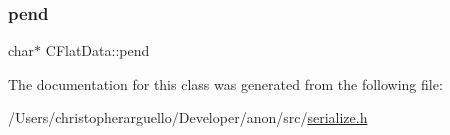 \mbox{\label{class_c_flat_data_add53aa6440254a30392bcf660f3f8057}} 
\subsubsection{\texorpdfstring{pend}{pend}}
{\footnotesize\ttfamily char$\ast$ C\+Flat\+Data\+::pend\hspace{0.3cm}{\ttfamily [protected]}}



The documentation for this class was generated from the following file\+:\begin{DoxyCompactItemize}
\item 
/\+Users/christopherarguello/\+Developer/anon/src/\mbox{\hyperlink{serialize_8h}{serialize.\+h}}\end{DoxyCompactItemize}
